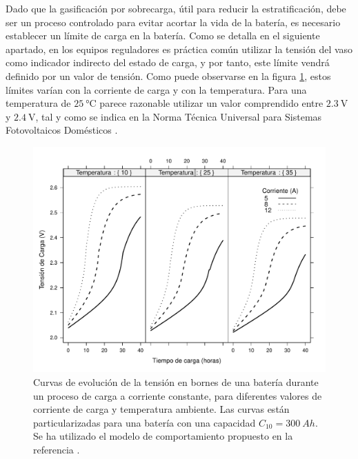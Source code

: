 Dado que la gasificación por sobrecarga, útil para reducir la estratificación,
debe ser un proceso controlado para evitar acortar la vida de la batería,
es necesario establecer un límite de carga en la batería. Como se
detalla en el siguiente apartado, en los equipos reguladores es práctica
común utilizar la tensión del vaso como indicador indirecto del estado
de carga, y por tanto, este límite vendrá definido por un valor de
tensión. Como puede observarse en la figura \ref{fig:CurvasCarga},
estos límites varían con la corriente de carga y con la temperatura.
Para una temperatura de $\SI{25}{\celsius}$ parece razonable utilizar
un valor comprendido entre $\SI{2.3}{\volt}$ y $\SI{2.4}{\volt}$,
tal y como se indica en la Norma Técnica Universal para Sistemas Fotovoltaicos
Domésticos \cite{Egido.Lorenzo1998}.

%
\begin{figure}
\begin{centering}
\includegraphics[scale=0.75]{../figs/Bateria_CorrYTemp}
\end{centering}

\caption[Curvas de evolución de la tensión en bornes de una batería durante
un proceso de carga a corriente constante]{Curvas de evolución de la tensión en bornes de una batería durante
un proceso de carga a corriente constante, para diferentes valores
de corriente de carga y temperatura ambiente. Las curvas están particularizadas
para una batería con una capacidad $C_{10}=\SI{300}{Ah}$. Se ha utilizado
el modelo de comportamiento propuesto en la referencia \cite{Copetti.Lorenzo.ea1993}.\label{fig:CurvasCarga}}

\end{figure}


